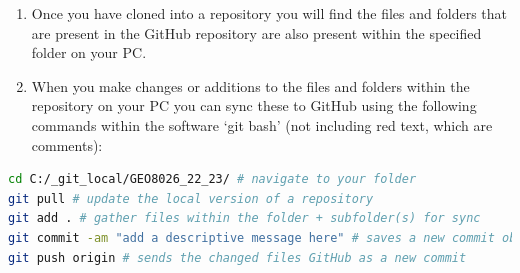 \documentclass[11pt,onecolumn,a4paper,notitlepage]{article}
\begin{document}
\begin{enumerate}
\item{Once you have cloned into a repository you will find the files and folders that are present in the GitHub repository are also present within the specified folder on your PC.}

\item{When you make changes or additions to the files and folders within the repository on your PC you can sync these to GitHub using the following commands within the software `git bash' (not including red text, which are comments):}

\end{enumerate}

\begin{lstlisting}[language=bash]
cd C:/_git_local/GEO8026_22_23/ # navigate to your folder
git pull # update the local version of a repository
git add . # gather files within the folder + subfolder(s) for sync
git commit -am "add a descriptive message here" # saves a new commit object 
git push origin # sends the changed files GitHub as a new commit
\end{lstlisting}
\end{document}
